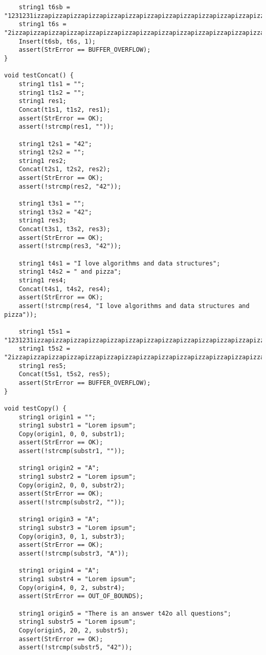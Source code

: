 \documentclass[a4paper,14pt]{extarticle}
\begin{document}
\begin{enumerate}
\begin{verbatim}
    string1 t6sb = "1231231izzapizzapizzapizzapizzapizzapizzapizzapizzapizzapizzapizzapizzapizzapizzapizzapizzapizzapizzapizzapizzapizzapizzapizzapizzapizzapizzapizzapizzapizza";
    string1 t6s = "2izzapizzapizzapizzapizzapizzapizzapizzapizzapizzapizzapizzapizzapizzapizzapizzapizzapizzapizzapizzapizza";
    Insert(t6sb, t6s, 1);
    assert(StrError == BUFFER_OVERFLOW);
}

void testConcat() {
    string1 t1s1 = "";
    string1 t1s2 = "";
    string1 res1;
    Concat(t1s1, t1s2, res1);
    assert(StrError == OK);
    assert(!strcmp(res1, ""));

    string1 t2s1 = "42";
    string1 t2s2 = "";
    string1 res2;
    Concat(t2s1, t2s2, res2);
    assert(StrError == OK);
    assert(!strcmp(res2, "42"));

    string1 t3s1 = "";
    string1 t3s2 = "42";
    string1 res3;
    Concat(t3s1, t3s2, res3);
    assert(StrError == OK);
    assert(!strcmp(res3, "42"));

    string1 t4s1 = "I love algorithms and data structures";
    string1 t4s2 = " and pizza";
    string1 res4;
    Concat(t4s1, t4s2, res4);
    assert(StrError == OK);
    assert(!strcmp(res4, "I love algorithms and data structures and pizza"));

    string1 t5s1 = "1231231izzapizzapizzapizzapizzapizzapizzapizzapizzapizzapizzapizzapizzapizzapizzapizzapizzapizzapizzapizzapizzapizzapizzapizzapizzapizzapizzapizzapizzapizza";
    string1 t5s2 = "2izzapizzapizzapizzapizzapizzapizzapizzapizzapizzapizzapizzapizzapizzapizzapizzapizzapizzapizzapizzapizza";
    string1 res5;
    Concat(t5s1, t5s2, res5);
    assert(StrError == BUFFER_OVERFLOW);
}

void testCopy() {
    string1 origin1 = "";
    string1 substr1 = "Lorem ipsum";
    Copy(origin1, 0, 0, substr1);
    assert(StrError == OK);
    assert(!strcmp(substr1, ""));

    string1 origin2 = "A";
    string1 substr2 = "Lorem ipsum";
    Copy(origin2, 0, 0, substr2);
    assert(StrError == OK);
    assert(!strcmp(substr2, ""));

    string1 origin3 = "A";
    string1 substr3 = "Lorem ipsum";
    Copy(origin3, 0, 1, substr3);
    assert(StrError == OK);
    assert(!strcmp(substr3, "A"));

    string1 origin4 = "A";
    string1 substr4 = "Lorem ipsum";
    Copy(origin4, 0, 2, substr4);
    assert(StrError == OUT_OF_BOUNDS);

    string1 origin5 = "There is an answer t42o all questions";
    string1 substr5 = "Lorem ipsum";
    Copy(origin5, 20, 2, substr5);
    assert(StrError == OK);
    assert(!strcmp(substr5, "42"));


\end{verbatim}
\end{enumerate}
\end{document}
